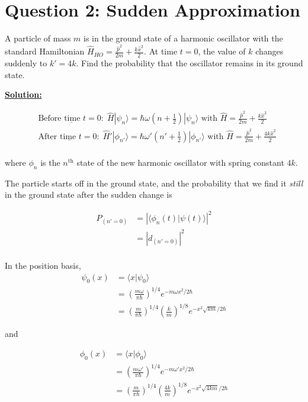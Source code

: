 \documentclass{article}
\newcommand{\ket}[1]{|#1 \rangle}
\newcommand{\inner}[2]{\langle #1 | #2 \rangle}
\begin{document}
\section*{Question 2: Sudden Approximation} 
A particle of mass $m$ is in the ground state of a harmonic oscillator with the standard Hamiltonian $\hat{H}_{HO} = \frac{\hat{p}^2}{2m} + \frac{k\hat{x}^2}{2}$. At time $t = 0$, the value of $k$ changes suddenly to $k' = 4k$. Find the probability that the oscillator remains in its ground state. 

\vskip 0.5cm
\underline{\textbf{Solution:}} 

\begin{align*}
  &\underline{\text{Before time $t = 0$}:} \;\hat{H} \ket{\psi_n} = \hbar\omega \left(n + \frac{1}{2}\right)\ket{\psi_n} \text{ with } \hat{H} = \frac{\hat{p}^2}{2m} + \frac{k\hat{x}^2}{2} \\
  &\underline{\text{After time $t = 0$}:} \;\hat{H}' \ket{\phi_{n'}} = \hbar\omega' \left(n'+ \frac{1}{2}\right)\ket{\phi_{n'}} \text{ with } \hat{H} = \frac{\hat{p}^2}{2m} + \frac{4k\hat{x}^2}{2} \\
\end{align*}

where $\phi_n$ is the $n^{\text{th}}$ state of the new harmonic oscillator with spring constant $4k$.

The particle starts off in the ground state, and the probability that we find it \emph{still} in the ground state after the sudden change is 

\begin{align*}
  P_{(n' = 0)} &= \left| \inner{\phi_n(t)}{\psi(t)} \right|^2 \\
  &= \left|d_{(n' = 0)}\right|^2 \\
\end{align*}

In the position basis, 
\begin{align*}
  \psi_0(x) &= \inner{x}{\psi_0} \\
  &= \left(\frac{m\omega}{\pi \hbar}\right)^{1/4} e^{-m\omega x^2 / 2\hbar} \\
  &= \left(\frac{m}{\pi \hbar}\right)^{1/4} \left(\frac{k}{m}\right)^{1/8} e^{-x^2\sqrt{km}/2\hbar}
\end{align*}

and 

\begin{align*}
  \phi_{0}(x) &= \inner{x}{\phi_0} \\
  &= \left(\frac{m\omega'}{\pi \hbar}\right)^{1/4} e^{-m\omega' x^2 / 2\hbar} \\
  &= \left(\frac{m}{\pi \hbar}\right)^{1/4} \left(\frac{4k}{m}\right)^{1/8} e^{-x^2\sqrt{4km}/2\hbar}
\end{align*}
\end{document}
